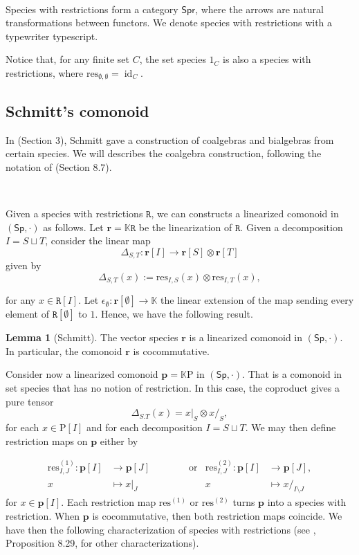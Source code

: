 \documentclass[12pt, reqno]{amsart}
\theoremstyle{definition}
\newtheorem{lm}[thm]{Lemma}
\DeclareMathOperator{\id}{id}
\newcommand{\Ss}{\mathsf{Sp}} %
\newcommand{\Spr}{\mathsf{Spr}} %
\newcommand{\rP}{\mathrm{P}}
\newcommand{\prR}{\mathtt{R}}
\newcommand{\tp}{\mathbf{p}}
\newcommand{\trr}{\mathbf{r}}
\begin{document}
\

Species with restrictions form a category $\Spr$, where the arrows are natural transformations between functors.
We denote species with restrictions with a typewriter typescript.

Notice that, for any finite set $C$, the set species $\mathrm{1}_C$ is also a species with restrictions, where $\text{res}_{\emptyset, \emptyset} = \id_C$.
\

\subsection{Schmitt's comonoid}
In \cite{Schmitt1993} (Section 3), Schmitt gave a construction of coalgebras and bialgebras from certain species. We will describes the coalgebra construction, following the notation of \cite{AM2010} (Section 8.7).

\

Given a species with restrictions $\prR$, we can constructs a linearized comonoid in $(\Ss, \cdot)$ as follows. Let $\trr=\mathbb{K}\prR$ be the linearization of $\prR$. Given a decomposition $I=S \sqcup T$, consider the linear map
\[
\Delta_{S,T}: \trr[I]\to \trr[S] \otimes \trr[T]
\]
given by
\begin{equation}\label{CoprodRestr}
\Delta_{S,T}(x):=\text{res}_{I,S}(x)\otimes \text{res}_{I,T}(x),
\end{equation}

for any $x \in \prR[I]$. Let $\epsilon_\emptyset: \trr[\emptyset]\to \mathbb{K}$ the linear extension of the map sending every element of $\prR[\emptyset]$ to $1$. Hence, we have the following result.

\begin{lm}[Schmitt]
The vector species $\trr$ is a linearized comonoid in $(\Ss, \cdot)$. In particular, the comonoid $\trr$ is cocommutative.
\end{lm}


Consider now a linearized comonoid $\tp=\mathbb{K}\rP$ in $(\Ss, \cdot)$. 
That is a comonoid in set species that has no notion of restriction.
In this case, the coproduct gives a pure tensor
\[\Delta_{S.T}(x)=x|_S \otimes x/_S,\]
for each $x \in \rP[I]$ and for each decomposition $I = S \sqcup T$. We may then define restriction maps on $\tp$ either by

\begin{align*}
\text{res}^{(1)}_{I,J}: \tp[I] &\to \tp[J] \qquad \qquad  \text{or}  &\text{res}^{(2)}_{I,J}: \tp[I] &\to \tp[J],\\
x&\mapsto x|_J \qquad &x&\mapsto x/_{I\setminus J}
\end{align*} 
for $x \in \tp[I]$. Each restriction map $\text{res}^{(1)}$ or $\text{res}^{(2)}$ turns $\tp$ into a species with restriction. When $\tp$ is cocommutative, then both restriction maps coincide. We have then the following characterization of species with restrictions (see \cite{AM2010}, Proposition 8.29, for other characterizations).
\end{document}
